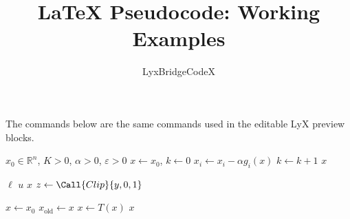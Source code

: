 \documentclass{article}
\title{LaTeX Pseudocode: Working Examples}
\author{LyxBridgeCodeX}
\date{}
\begin{document}
\maketitle
The commands below are the same commands used in the editable LyX preview blocks.

\begin{algorithm}[h]
\caption{Nested While and For loops}\label{alg:loops}
\begin{algorithmic}[1]
\Require $x_0\in\mathbb{R}^n$, $K>0$, $\alpha>0$, $\varepsilon>0$
\State $x\gets x_0$, $k\gets 0$
    \State $x_i\gets x_i-\alpha g_i(x)$
  \EndFor
  \State $k\gets k+1$
\EndWhile
\State \Return $x$
\end{algorithmic}
\end{algorithm}

\begin{algorithm}[h]
\caption{If, ElseIf, Else and Return}\label{alg:branches}
\begin{algorithmic}[1]
    \State \Return $\ell$ 
    \State \Return $u$ 
  \Else
    \State \Return $x$
  \EndIf
\EndFunction
\State $z\gets\Call{Clip}{y,0,1}$
\end{algorithmic}
\end{algorithm}

\begin{algorithm}[h]
\caption{Repeat, Procedure and ForAll}\label{alg:repeat}
\begin{algorithmic}[1]
  \State $x\gets x_0$
  \Repeat
    \State $x_{\mathrm{old}}\gets x$
    \State $x\gets T(x)$ 
  \State \Return $x$
\EndProcedure
{}
  \State {}
\EndFor
\end{algorithmic}
\end{algorithm}
\end{document}
